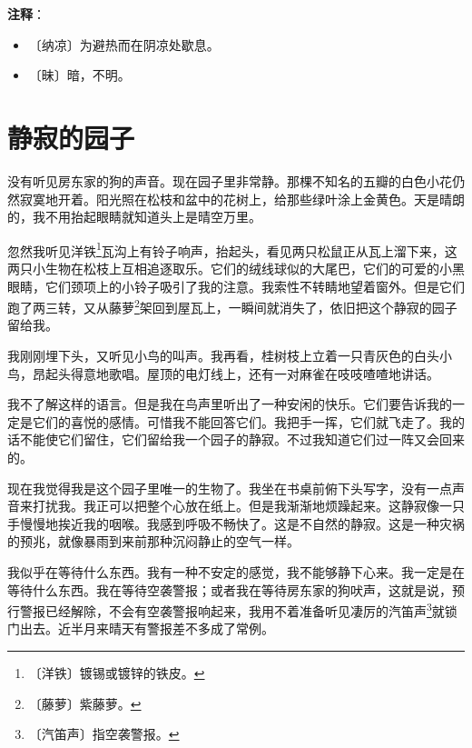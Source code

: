 \documentclass[12pt,UTF-8,openany]{ctexbook}
\begin{document}
\newpage

\textbf{注释}：

\vspace{-1em}

\begin{itemize}
    \setlength\itemsep{-0.2em}
    \item 〔纳凉〕为避热而在阴凉处歇息。
    \item 〔昧〕暗，不明。
\end{itemize}

\chapter{静寂的园子}

\begin{normalsize}
    
    没有听见房东家的狗的声音。现在园子里非常静。那棵不知名的五瓣的白色小花仍然寂寞地开着。阳光照在松枝和盆中的花树上，给那些绿叶涂上金黄色。天是晴朗的，我不用抬起眼睛就知道头上是晴空万里。
    
    忽然我听见洋铁\footnote{〔洋铁〕镀锡或镀锌的铁皮。}瓦沟上有铃子响声，抬起头，看见两只松鼠正从瓦上溜下来，这两只小生物在松枝上互相追逐取乐。它们的绒线球似的大尾巴，它们的可爱的小黑眼睛，它们颈项上的小铃子吸引了我的注意。我索性不转睛地望着窗外。但是它们跑了两三转，又从藤萝\footnote{〔藤萝〕紫藤萝。}架回到屋瓦上，一瞬间就消失了，依旧把这个静寂的园子留给我。
    
    我刚刚埋下头，又听见小鸟的叫声。我再看，桂树枝上立着一只青灰色的白头小鸟，昂起头得意地歌唱。屋顶的电灯线上，还有一对麻雀在吱吱喳喳地讲话。
    
    我不了解这样的语言。但是我在鸟声里听出了一种安闲的快乐。它们要告诉我的一定是它们的喜悦的感情。可惜我不能回答它们。我把手一挥，它们就飞走了。我的话不能使它们留住，它们留给我一个园子的静寂。不过我知道它们过一阵又会回来的。
    
    现在我觉得我是这个园子里唯一的生物了。我坐在书桌前俯下头写字，没有一点声音来打扰我。我正可以把整个心放在纸上。但是我渐渐地烦躁起来。这静寂像一只手慢慢地挨近我的咽喉。我感到呼吸不畅快了。这是不自然的静寂。这是一种灾祸的预兆，就像暴雨到来前那种沉闷静止的空气一样。
    
    我似乎在等待什么东西。我有一种不安定的感觉，我不能够静下心来。我一定是在等待什么东西。我在等待空袭警报；或者我在等待房东家的狗吠声，这就是说，预行警报已经解除，不会有空袭警报响起来，我用不着准备听见凄厉的汽笛声\footnote{〔汽笛声〕指空袭警报。}就锁门出去。近半月来晴天有警报差不多成了常例。
    

\end{normalsize}
\end{document}
